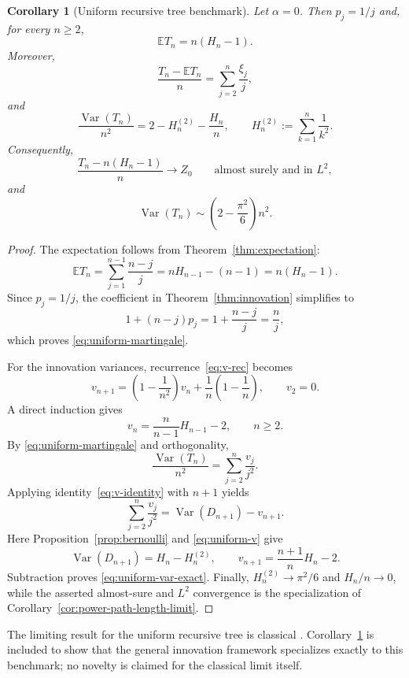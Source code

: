\documentclass[11pt,a4paper]{article}
\newtheorem{corollary}[theorem]{Corollary}
\newcommand{\E}{\mathbb{E}}
\newcommand{\Var}{\operatorname{Var}}
\newcommand{\1}{\mathbf{1}}
\begin{document}
\begin{corollary}[Uniform recursive tree benchmark]\label{cor:uniform}
Let $\alpha=0$.  Then $p_j=1/j$ and, for every $n\ge2$,
\begin{equation}\label{eq:uniform-mean}
\E T_n=n(H_n-1).
\end{equation}
Moreover,
\begin{equation}\label{eq:uniform-martingale}
\frac{T_n-\E T_n}{n}
=
\sum_{j=2}^n\frac{\xi_j}{j},
\end{equation}
and
\begin{equation}\label{eq:uniform-var-exact}
\frac{\Var(T_n)}{n^2}
=
2-H_n^{(2)}-\frac{H_n}{n},
\qquad
H_n^{(2)}:=\sum_{k=1}^n\frac1{k^2}.
\end{equation}
Consequently,
\[
\frac{T_n-n(H_n-1)}{n}
\longrightarrow Z_0
\qquad\text{almost surely and in }L^2,
\]
and
\begin{equation}\label{eq:uniform-var-asym}
\Var(T_n)
\sim
\left(2-\frac{\pi^2}{6}\right)n^2.
\end{equation}
\end{corollary}

\begin{proof}
The expectation follows from Theorem~\ref{thm:expectation}:
\[
\E T_n
=
\sum_{j=1}^{n-1}\frac{n-j}{j}
=
nH_{n-1}-(n-1)
=
n(H_n-1).
\]
Since $p_j=1/j$, the coefficient in
Theorem~\ref{thm:innovation} simplifies to
\[
1+(n-j)p_j
=
1+\frac{n-j}{j}
=
\frac{n}{j},
\]
which proves \eqref{eq:uniform-martingale}.

For the innovation variances, recurrence~\eqref{eq:v-rec} becomes
\[
v_{n+1}
=
\left(1-\frac1{n^2}\right)v_n
+
\frac1n\left(1-\frac1n\right),
\qquad v_2=0.
\]
A direct induction gives
\begin{equation}\label{eq:uniform-v}
v_n=\frac{n}{n-1}H_{n-1}-2,
\qquad n\ge2.
\end{equation}
By \eqref{eq:uniform-martingale} and orthogonality,
\[
\frac{\Var(T_n)}{n^2}
=
\sum_{j=2}^n\frac{v_j}{j^2}.
\]
Applying identity~\eqref{eq:v-identity} with $n+1$ yields
\[
\sum_{j=2}^n\frac{v_j}{j^2}
=
\Var(D_{n+1})-v_{n+1}.
\]
Here Proposition~\ref{prop:bernoulli} and \eqref{eq:uniform-v} give
\[
\Var(D_{n+1})=H_n-H_n^{(2)},
\qquad
v_{n+1}=\frac{n+1}{n}H_n-2.
\]
Subtraction proves \eqref{eq:uniform-var-exact}.  Finally,
$H_n^{(2)}\to\pi^2/6$ and $H_n/n\to0$, while the asserted almost-sure and
$L^2$ convergence is the specialization of
Corollary~\ref{cor:power-path-length-limit}.
\end{proof}

The limiting result for the uniform recursive tree is classical
\citep{Mahmoud1991,DobrowFill1999}.  Corollary~\ref{cor:uniform} is included
to show that the general innovation framework specializes exactly to this
benchmark; no novelty is claimed for the classical limit itself.
\end{document}
